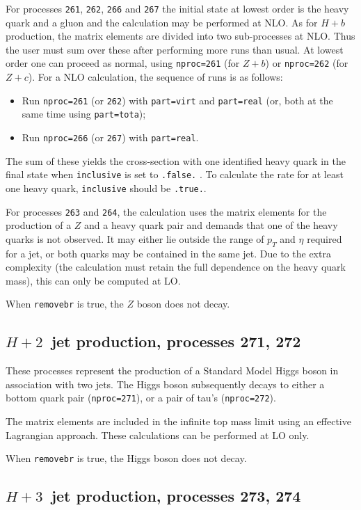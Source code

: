\documentclass[12pt]{article}
\begin{document}
For processes {\tt 261}, {\tt 262}, {\tt 266} and {\tt 267} the initial
state at lowest order is the heavy quark and a gluon and 
the calculation may be performed at NLO.
As for $H+b$ production, the matrix elements are divided into two
sub-processes at NLO. Thus the user must sum over these after performing
more runs than usual. At lowest order one can proceed as normal, using
{\tt nproc=261} (for $Z+b$) or {\tt nproc=262} (for $Z+c$).
For a NLO calculation, the sequence of runs is as follows:
\begin{itemize}
\item Run {\tt nproc=261} (or {\tt 262}) with {\tt part=virt} and
{\tt part=real} (or, both at the same time using {\tt part=tota});
\item Run {\tt nproc=266} (or {\tt 267}) with {\tt part=real}.
\end{itemize}
The sum of these yields the cross-section with one identified heavy quark in
the final state when {\tt inclusive} is set to {\tt .false.} . To calculate the
rate for at least one heavy quark, {\tt inclusive} should be {\tt .true.}.

For processes {\tt 263} and
{\tt 264}, the calculation uses the matrix elements for the production
of a $Z$ and a heavy quark pair and demands that one of the heavy quarks
is not observed. It may either lie outside the range of $p_T$ and $\eta$
required for a jet, or both quarks may be contained in the same jet.
Due to the extra complexity (the calculation must retain the full
dependence on the heavy quark mass), this can only be computed at LO.

When {\tt removebr} is true, the $Z$ boson does not decay.

\subsection{$H + 2$~jet production, processes 271, 272}

These processes represent the production of a Standard Model Higgs boson
in association with two jets. The Higgs boson
subsequently decays to either a bottom quark pair ({\tt nproc=271}), 
or a pair of tau's ({\tt nproc=272}).

The matrix elements are included in the infinite top mass limit
using an effective Lagrangian approach. These calculations can be
performed at LO only.

When {\tt removebr} is true, the Higgs boson does not decay.

\subsection{$H + 3$~jet production, processes 273, 274}
\end{document}
